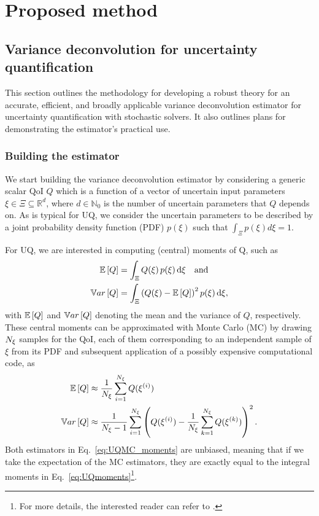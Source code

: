 \chapter{Proposed method} \label{ch-method}
\section{Variance deconvolution for uncertainty quantification}\label{sec:method-uq}
This section outlines the methodology for developing a robust theory for an accurate, efficient, and broadly applicable variance deconvolution estimator for uncertainty quantification with stochastic solvers. It also outlines plans for demonstrating the estimator's practical use. 

\subsection{Building the estimator}
We start building the variance deconvolution estimator by considering a generic scalar QoI $Q$ which is a function of a vector of uncertain input parameters $\xi \in \Xi \subseteq \mathbb{R}^d$, where $d \in \mathbb{N}_0$ is the number of uncertain parameters that $Q$ depends on. As is typical for UQ, we consider the uncertain parameters to be described by a joint probability density function (PDF) $p(\xi)$ such that $\int_\Xi p(\xi) d\xi = 1$.

For UQ, we are interested in computing (central) moments of Q, such as
\begin{equation}\label{eq:UQmoments}
    \begin{split}
        \mathbb{E}\left[Q\right]  &= \int_\Xi{ Q(\xi) \, p(\xi) \, \mathrm{d}\xi  } \quad \mathrm{and} \\
        \mathbb{V}ar\left[Q\right] &= \int_\Xi{ \left( Q(\xi) - \mathbb{E}\left[Q\right] \right)^2 p(\xi) \, \mathrm{d}\xi  },
    \end{split}
\end{equation}
with $\mathbb{E}\left[Q\right]$ and $\mathbb{V}ar\left[Q\right]$ denoting the mean and the variance of $Q$, respectively. These central moments can be approximated with Monte Carlo (MC) by drawing ${N_\xi}$ samples for the QoI, each of them corresponding to an independent sample of $\xi$ from its PDF and subsequent application of a possibly expensive computational code, as
\begin{equation} \label{eq:UQMC_moments}
    \begin{split}
        \mathbb{E}\left[Q\right]  &\approx \frac{1}{{N_\xi}} \sum_{i=1}^{{N_\xi}} Q( \xi^{(i)} )  \\
        \mathbb{V}ar\left[Q\right] &\approx \frac{1}{{N_\xi}-1} \sum_{i=1}^{{N_\xi}} \left(Q( \xi^{(i)} ) - \frac{1}{{N_\xi}} \sum_{k=1}^{{N_\xi}} Q(\xi^{(k)})\right)^2.
    \end{split}
\end{equation}
Both estimators in Eq.~\eqref{eq:UQMC_moments} are unbiased, meaning that if we take the expectation of the MC estimators, they are exactly equal to the integral moments in Eq.~\eqref{eq:UQmoments}\footnote{For more details, the interested reader can refer to \cite{Owen}.}. 

